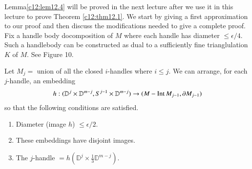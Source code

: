 Lemma\pageoriginale \ref{c12:lem12.4} will be proved in the next
lecture after we 
use it in this lecture to prove Theorem \ref{c12:thm12.1}. We start by
giving a first approximation to our proof and then discuss the
modifications needed to give a complete proof. Fix a handle body
docomposition of $M$ where each handle has diameter $\leq
\epsilon/4$. Such a handlebody can be constructed as dual to a
sufficiently fine trianglulation $K$ of $M$. See Figure 10.

\begin{figure}[H]
\end{figure}

Let $M_j=$ union of all the closed $i$-handles where $i \leq j$. We
can arrange, for each $j$-handle, an embedding
$$
h: (\mathbb{D}^j \times \mathbb{D}^{m-j}, S^{j-1} \times
\mathbb{D}^{m-j}) \to (M - \operatorname{Int} M_{j-1}, \partial M_{j-1})
$$
so that the following conditions are satisfied.
\begin{enumerate}
  \item Diameter (image $h$) $\leq \epsilon/2$.
    \item These embeddings have disjoint images.
      \item The $j$-handle $=h(\mathbb{D}^j \times \frac{1}{3}
        \mathbb{D}^{m-j})$.
\end{enumerate}

